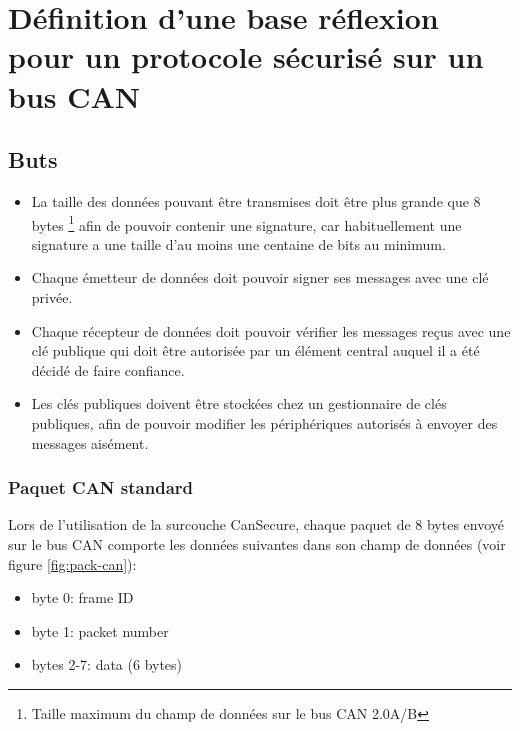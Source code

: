 \chapter{Définition d'une base réflexion pour un protocole sécurisé sur un bus CAN}
\blindtext



\section{Buts}
\blindtext

\begin{itemize}
	\item La taille des données pouvant être transmises doit être plus grande que 8 bytes \footnote{Taille maximum du champ de données sur le bus CAN 2.0A/B} afin de pouvoir contenir une signature, car habituellement une signature a une taille d'au moins une centaine de bits au minimum.
	\item Chaque émetteur de données doit pouvoir signer ses messages avec une clé privée.
	\item Chaque récepteur de données doit pouvoir vérifier les messages reçus avec une clé publique qui doit être autorisée par un élément central auquel il a été décidé de faire confiance.
	\item Les clés publiques doivent être stockées chez un gestionnaire de clés publiques, afin de pouvoir modifier les périphériques autorisés à envoyer des messages aisément.
\end{itemize}

\subsection{Paquet CAN standard}
Lors de l'utilisation de la surcouche CanSecure, chaque paquet de 8 bytes envoyé sur le bus CAN comporte les données suivantes dans son champ de données (voir figure \ref{fig:pack-can}):
\begin{itemize}
	\item byte 0: frame ID
	\item byte 1: packet number
	\item bytes 2-7: data (6 bytes)
\end{itemize}

